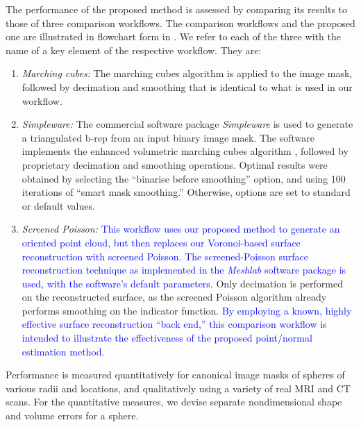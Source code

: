 The performance of the proposed method is assessed by comparing its results to those of three comparison workflows.  The comparison workflows and the proposed one are illustrated in flowchart form in .  We refer to each of the three with the name of a key element of the respective workflow.  They are:
\begin{enumerate}
\item  {\em Marching cubes:}  The marching cubes algorithm is applied to the image mask, followed by decimation and smoothing that is identical to what is used in our workflow.
\item  {\em Simpleware:}  The commercial software package {\em Simpleware} is used to generate a triangulated b-rep from an input binary image mask.  The software implements the enhanced volumetric marching cubes algorithm \cite{young_2008}, followed by proprietary decimation and smoothing operations.  Optimal results were obtained by selecting the ``binarise before smoothing'' option, and using 100 iterations of ``smart mask smoothing.''  Otherwise, options are set to standard or default values.
\item  {\em Screened Poisson:}  \textcolor{blue}{This workflow uses our proposed method to generate an oriented point cloud, but then replaces our Voronoi-based surface reconstruction with screened Poisson.  The screened-Poisson surface reconstruction technique \cite{kazhdan_2013} as implemented in the \textit{Meshlab} software package is used, with the software's default parameters.}  Only decimation is performed on the reconstructed surface, as the screened Poisson algorithm already performs smoothing on the indicator function.  \textcolor{blue}{By employing a known, highly effective surface reconstruction ``back end,'' this comparison workflow is intended to illustrate the effectiveness of the proposed point/normal estimation method.}
\end{enumerate}
Performance is measured quantitatively for canonical image masks of spheres of various radii and locations, and qualitatively using a variety of real MRI and CT scans.  For the quantitative measures, we devise separate nondimensional shape and volume errors for a sphere.